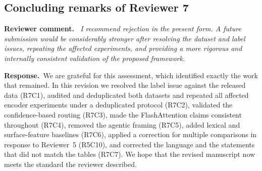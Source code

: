 \documentclass[11pt,a4paper]{article}
\newenvironment{reviewercomment}{\par\noindent\textbf{Reviewer comment.}\itshape\ }{\par}
\newcommand{\response}{\par\noindent\textbf{Response.}\ }
\begin{document}
\subsection*{Concluding remarks of Reviewer 7}
\begin{reviewercomment}
I recommend rejection in the present form. A future submission would be considerably stronger after resolving the dataset and label issues, repeating the affected experiments, and providing a more rigorous and internally consistent validation of the proposed framework.
\end{reviewercomment}
\response We are grateful for this assessment, which identified exactly the work that remained. In this revision we resolved the label issue against the released data (R7C1), audited and deduplicated both datasets and repeated all affected encoder experiments under a deduplicated protocol (R7C2), validated the confidence-based routing (R7C3), made the FlashAttention claims consistent throughout (R7C4), removed the agentic framing (R7C5), added lexical and surface-feature baselines (R7C6), applied a correction for multiple comparisons in response to Reviewer~5 (R5C10), and corrected the language and the statements that did not match the tables (R7C7). We hope that the revised manuscript now meets the standard the reviewer described.
\end{document}
